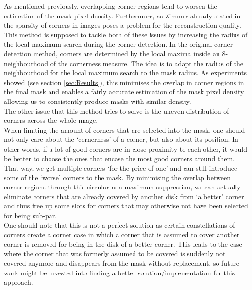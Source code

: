 As mentioned previously, overlapping corner regions tend to worsen the estimation of the mask pixel
density. 
Furthermore, as Zimmer already stated in \cite{zimmer07} the sparsity of corners in images poses a
problem for the reconstruction quality. This method is supposed to tackle both of these issues by
increasing the radius of the local maximum search during the corner detection. In the original
corner detection method, corners are determined by the local maxima inside an 
8-neighbourhood of the cornerness measure. The idea is to adapt the radius of the neighbourhood for the
local maximum search to the mask radius. As experiments showed (see section \ref{sec:Results}), this minimises the overlap in
corner regions in the final mask and enables a fairly accurate estimation of the mask pixel
density allowing us to consistently produce masks with similar density. \\
The other issue that this method tries to solve is the uneven distribution of corners across
the whole image. \\
When limiting the amount of corners that are selected into the mask, one should not only care about
the `cornerness' of a corner, but also about its position. In other words, if a lot of good corners
are in close proximity to each other, it would be better to choose the ones that encase the most
good corners around them. That way, we get multiple corners `for the price of one' and can still
introduce some of the `worse' corners to the mask.
By minimising the overlap between corner regions through this circular non-maximum suppression, we
can actually eliminate corners that are already covered by another disk from `a better' corner and
thus free up some slots for corners that may otherwise not have been selected for being sub-par.\\
One should note that this is not a perfect solution as certain constellations of corners create
a corner case in which a corner that is assumed to cover another corner is removed for being in the
disk of a better corner. This leads to the case where the corner that was formerly assumed to be
covered is suddenly not covered anymore and disappears from the mask without replacement, so future
work might be invested into finding a better solution/implementation for this approach.

